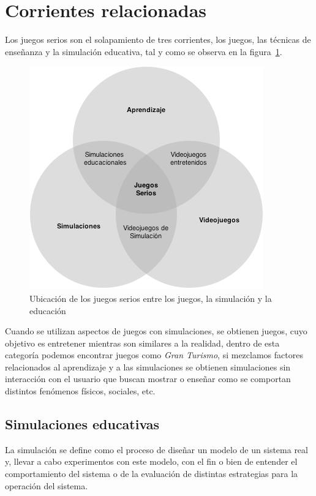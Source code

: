 \section{Corrientes relacionadas}

Los juegos serios son el solapamiento de tres corrientes, los juegos, las
técnicas de enseñanza y la simulación educativa\cite{education:games}, tal y
como se observa en la figura~\ref{fig:corrientes_relacionadas}. 

\begin{figure}[ht]
\centering
\includegraphics[scale=0.5]{juegos_serios/corrientes_paralelas.png}
\caption{Ubicación de los juegos serios entre los juegos, la simulación y la educación}
\label{fig:corrientes_relacionadas}
\end{figure}

Cuando se utilizan aspectos de juegos con simulaciones, se obtienen juegos, cuyo
objetivo es entretener mientras son similares a la realidad, dentro de esta
categoría podemos encontrar juegos como \emph{Gran Turismo}, si mezclamos factores relacionados al aprendizaje y a las
simulaciones se obtienen simulaciones sin interacción con el usuario que buscan
mostrar o enseñar como se comportan distintos fenómenos físicos, sociales, etc.


\subsection{Simulaciones educativas}

La simulación se define como el proceso de diseñar un modelo de un sistema real
y, llevar a cabo experimentos con este modelo, con el fin o bien de entender el
comportamiento del sistema o de la evaluación de distintas estrategias para la
operación del sistema\cite{ingalls2008introduction}. 

